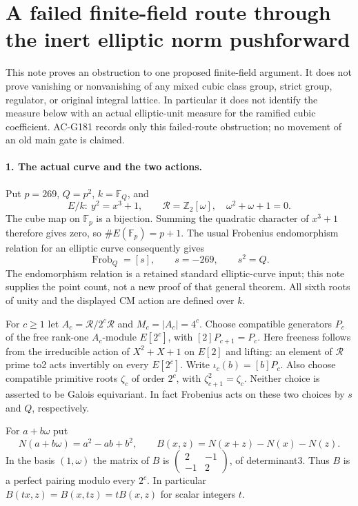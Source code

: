 \section{A failed finite-field route through the inert elliptic norm pushforward}
\label{sec:elliptic-norm-pushforward-obstruction}

This note proves an obstruction to one proposed finite-field argument.
It does not prove vanishing or nonvanishing of any mixed cubic class group,
strict group, regulator, or original integral lattice.  In particular it
does not identify the measure below with an actual elliptic-unit measure
for the ramified cubic coefficient.  AC-G181 records only this failed-route
obstruction; no movement of an old main gate is claimed.

\paragraph{1. The actual curve and the two actions.}
Put $p=269$, $Q=p^2$, $k=\mathbb F_Q$, and
\[
 E/k:\ y^2=x^3+1,\qquad
 \mathcal R=\mathbb Z_2[\omega],\quad \omega^2+\omega+1=0.
\]
The cube map on $\mathbb F_p$ is a bijection.  Summing the quadratic
character of $x^3+1$ therefore gives zero, so
$\#E(\mathbb F_p)=p+1$.  The usual Frobenius endomorphism relation for an
elliptic curve consequently gives
\[
 \operatorname{Frob}_{Q}=[s],\qquad s=-269,\qquad s^2=Q.       \tag{EN.1}
\]
The endomorphism relation is a retained standard elliptic-curve input;
this note supplies the point count, not a new proof of that general
theorem.  All sixth roots of unity and the displayed CM action are
defined over $k$.

For $c\geq1$ let $A_c=\mathcal R/2^c\mathcal R$ and $M_c=|A_c|=4^c$.
Choose compatible generators $P_c$ of the free rank-one $A_c$-module
$E[2^c]$, with $[2]P_{c+1}=P_c$.  Here freeness follows from the
irreducible action of $X^2+X+1$ on $E[2]$ and lifting: an element of
$\mathcal R$ prime to2 acts invertibly on every $E[2^c]$.
Write $\iota_c(b)=[b]P_c$.  Also choose compatible primitive roots
$\zeta_c$ of order $2^c$, with $\zeta_{c+1}^2=\zeta_c$.
Neither choice is asserted to be Galois equivariant.  In fact Frobenius
acts on these two choices by $s$ and $Q$, respectively.

For $a+b\omega$ put
\[
 N(a+b\omega)=a^2-ab+b^2,\qquad
 B(x,z)=N(x+z)-N(x)-N(z).
\]
In the basis $(1,\omega)$ the matrix of $B$ is
$\left(\begin{smallmatrix}2&-1\\-1&2\end{smallmatrix}\right)$, of
determinant3.  Thus $B$ is a perfect pairing modulo every $2^c$.
In particular $B(tx,z)=B(x,tz)=tB(x,z)$ for scalar integers $t$.

